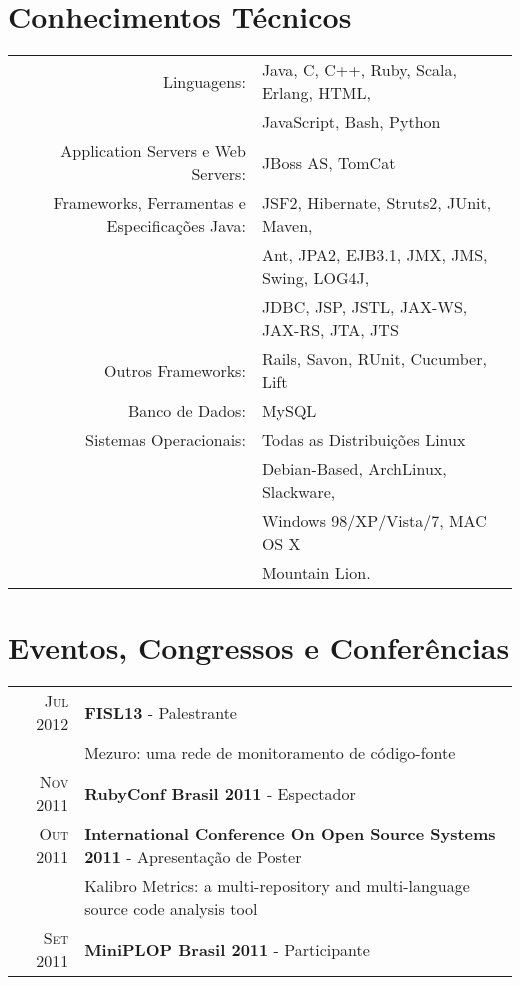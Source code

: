 \documentclass[a4paper,10pt]{article} %
\begin{document}
\section{Conhecimentos Técnicos}

\begin{tabular}{r|p{11cm}}
Linguagens: & Java, C, C++, Ruby, Scala, Erlang, HTML,\\& JavaScript, Bash, Python\multicolumn{2}{c}{} \\

Application Servers e Web Servers: & JBoss AS, TomCat\multicolumn{2}{c}{} \\

Frameworks, Ferramentas e Especificações Java: & JSF2, Hibernate, Struts2, JUnit, Maven,\\& Ant, JPA2, EJB3.1, JMX, JMS, Swing, LOG4J,\\& JDBC, JSP, JSTL, JAX-WS, JAX-RS, JTA, JTS\multicolumn{2}{c}{} \\

Outros Frameworks: & Rails, Savon, RUnit, Cucumber, Lift\multicolumn{2}{c}{} \\

Banco de Dados: & MySQL\multicolumn{2}{c}{} \\

Sistemas Operacionais: & Todas as Distribuições Linux \\&Debian-Based, ArchLinux, Slackware, \\&Windows 98/XP/Vista/7, MAC OS X\\& Mountain Lion.\\


\end{tabular}


\section{Eventos, Congressos e Conferências}

\begin{tabular}{rl}
\textsc{Jul} 2012 & \textbf{FISL13} - Palestrante\\
& \footnotesize{Mezuro: uma rede de monitoramento de código-fonte}\\

\textsc{Nov} 2011 & \textbf{RubyConf Brasil 2011} - Espectador\\
\textsc{Out} 2011 & \textbf{International Conference On Open Source Systems 2011} - Apresentação de Poster\\
& \footnotesize{Kalibro Metrics: a multi-repository and multi-language source code analysis tool}\\
\textsc{Set} 2011 & \textbf{MiniPLOP Brasil 2011} - Participante

\end{tabular}
\end{document}

